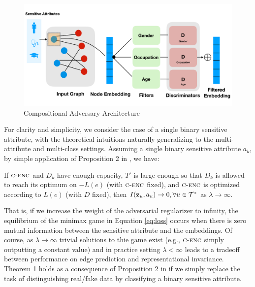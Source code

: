 \begin{figure}
    \centering
    \includegraphics[width=1\linewidth]{icml2019_style/paper/plots/LightningTalk-Graphic.pdf}
    \vspace{-5mm}
    \caption{Compositional Adversary Architecture}
    \label{arch}
\end{figure}

For clarity and simplicity, we consider the case of a single binary sensitive attribute, with the theoretical intuitions naturally generalizing to the multi-attribute and multi-class settings.
Assuming a single binary sensitive attribute $a_k$, by simple application of Proposition 2 in \citet{goodfellow2014generative}, we have:
\begin{theorem}
If $\textsc{c-enc}$ and $D_k$ have enough capacity, $T'$ is large enough so that $D_k$
is allowed to reach its optimum on $-L(e)$ (with $\textsc{c-enc}$ fixed), and $\textsc{c-enc}$ is optimized according to $L(e)$ (with $D$ fixed), then $I(\mathbf{z}_u, a_u) \rightarrow 0, \forall u \in \mathcal{T}^*$ as $\lambda \rightarrow \infty$. 
\end{theorem}
That is, if we increase the weight of the adversarial regularizer to infinity, the equilibrium of the minimax game in Equation \eqref{eq:loss} occurs when there is zero mutual information between the sensitive attribute and the embeddings. 
Of course, as $\lambda \rightarrow \infty$ trivial solutions to thie game exist (e.g., $\textsc{c-enc}$ simply outputting a constant value) and in practice setting $\lambda < \infty$ leads to a tradeoff between performance on edge prediction and representational invariance.
Theorem 1 holds as a consequence of Proposition 2 in \citet{goodfellow2014generative} if we simply replace the task of distinguishing real/fake data by classifying a binary sensitive attribute. 